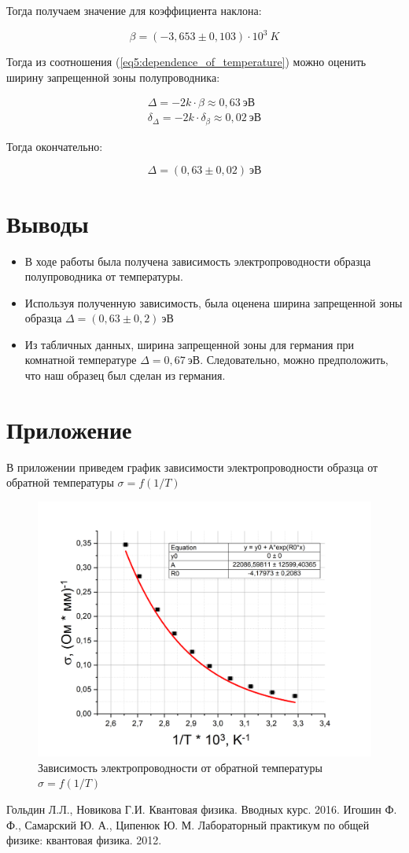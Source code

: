 \documentclass[a4paper,12pt]{article}
\begin{document}
Тогда получаем значение для коэффициента наклона:

$$
	\beta = (-3,653	 \pm 0,103)\cdot 10^3 \ K
$$

Тогда из соотношения (\ref{eq5:dependence_of_temperature}) можно оценить ширину запрещенной зоны полупроводника:

\begin{align*}
	\Delta = -2k \cdot \beta \approx 0,63 \ эВ \\
	\delta_{\Delta} = -2k \cdot \delta_{\beta} \approx 0,02\ эВ 
\end{align*}

Тогда окончательно:

$$
	\Delta = (0,63 \pm 0,02) \ эВ
$$

\section*{Выводы}
\begin{itemize}
	\item В ходе работы была получена зависимость электропроводности образца полупроводника от температуры.
	\item Используя полученную зависимость, была оценена ширина запрещенной зоны образца $\Delta = (0,63 \pm 0,2) \ эВ$ 
	\item Из табличных данных, ширина запрещенной зоны для германия при комнатной температуре $\Delta = 0,67 \ эВ$. Следовательно, можно предположить, что наш образец был сделан из германия.
\end{itemize}

\section*{Приложение}

В приложении приведем график зависимости электропроводности образца от обратной температуры $\sigma = f(1/T)$

\begin{figure}[h!]
	\centering
	\includegraphics[width=0.7\linewidth]{exp_sigma(T)}
	\caption{Зависимость электропроводности от обратной температуры $\sigma = f(1/T)$}
\end{figure}

\begin{thebibliography}{2}
Гольдин Л.Л., Новикова Г.И. Квантовая физика. Вводных курс. 2016.
Игошин Ф. Ф., Самарский Ю. А., Ципенюк Ю. М. Лабораторный практикум по общей физике: квантовая физика. 2012.
\end{thebibliography}
\end{document}
